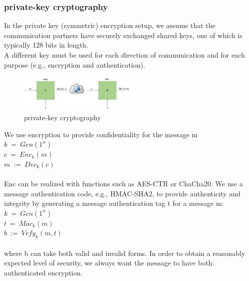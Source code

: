 \subsubsection{private-key cryptography}\cite{b38}
In the private key (symmetric) encryption setup, we assume that the communication partners 
have securely exchanged shared keys, one of which is typically 128 bits in length.
\\
A different key must be used for each direction of communication and for each purpose 
(e.g., encryption and authentication).
\begin{figure}[H] %
    \centering %
    \includegraphics[width=0.5\textwidth]{figures/private.png} %
    \caption{private-key cryptography} %
    \label{Fig.2: private-key cryptography} %
\end{figure}
We use encryption to provide confidentiality for the message m
\\
$k \ = \ Gen(1^n)$
\\
$c \ = \ Enc_k(m)$
\\
$m \ := \ Dec_k(c)$
\\
\\
Enc can be realized with functions such as AES-CTR or ChaCha20.
We use a message authentication code, e.g., HMAC-SHA2, to provide authenticity and 
integrity by generating a message authentication tag t for a message m:
\\
$k \ = \ Gen(1^n)$
\\
$t \ = \ Mac_k(m)$
\\
$b \ := \ Vrfy_k(m, t)$
\\
\\
where b can take both valid and invalid forms.
In order to obtain a reasonably expected level of security, we always want the message 
to have both: authenticated encryption.


